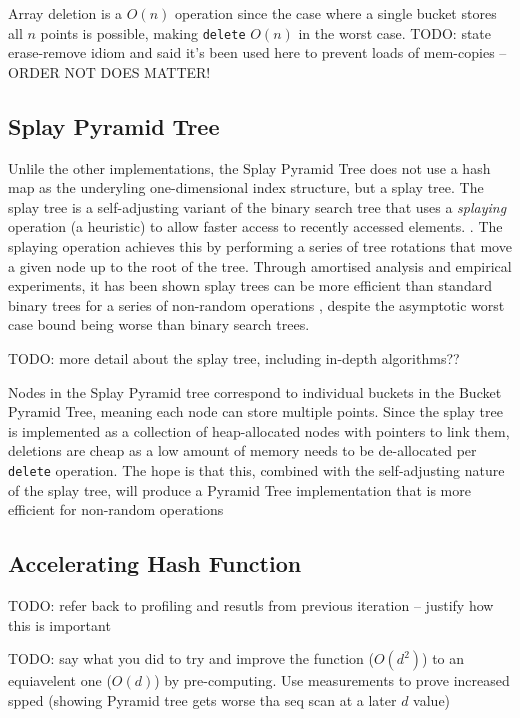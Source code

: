 Array deletion is a $O(n)$ operation since the case where a single bucket stores all $n$ points is possible, making \texttt{delete} $O(n)$ in the worst case. TODO: state erase-remove idiom and said it's been used here to prevent loads of mem-copies -- ORDER NOT DOES MATTER!

\subsection{Splay Pyramid Tree}

Unlile the other implementations, the Splay Pyramid Tree does not use a hash map as the underyling one-dimensional index structure, but a splay tree. The splay tree is a self-adjusting variant of the binary search tree that uses a \textit{splaying} operation (a heuristic) to allow faster access to recently accessed elements. \cite{splay-tree}. The splaying operation achieves this by performing a series of tree rotations that move a given node up to the root of the tree. Through amortised analysis and empirical experiments, it has been shown splay trees can be more efficient than standard binary trees for a series of non-random operations \cite{splay-tree, TODO}, despite the asymptotic worst case bound being worse than binary search trees.

TODO: more detail about the splay tree, including in-depth algorithms??

Nodes in the Splay Pyramid tree correspond to individual buckets in the Bucket Pyramid Tree, meaning each node can store multiple points. Since the splay tree is implemented as a collection of heap-allocated nodes with pointers to link them, deletions are cheap as a low amount of memory needs to be de-allocated per \texttt{delete} operation. The hope is that this, combined with the self-adjusting nature of the splay tree, will produce a Pyramid Tree implementation that is more efficient for non-random operations

\subsection{Accelerating Hash Function}

TODO: refer back to profiling and resutls from previous iteration -- justify how this is important

TODO: say what you did to try and improve the function ($O(d^2)$) to an equiavelent one ($O(d)$) by pre-computing. Use measurements to prove increased spped (showing Pyramid tree gets worse tha seq scan at a later $d$ value)

